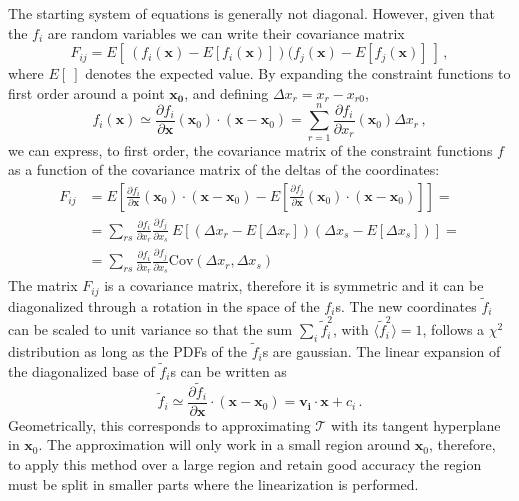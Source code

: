 \documentclass[10pt,a4paper]{article}
\newcommand{\bfx}{\mathbf{x}}
\begin{document}
The starting system of equations is generally not diagonal. However, given that the ${f_i}$ are random variables we can write their covariance matrix
\begin{equation}
F_{ij} = E[\ (f_i(\bfx) - E[f_i(\bfx)])(f_j(\bfx) - E[f_j(\bfx)]\ ]\, ,
\end{equation}
where $E[\ ]$ denotes the expected value. By expanding the constraint functions to first order around a point $\mathbf{x_0}$, and defining $\Delta x_r = x_r - x_{r0}$,
\begin{equation}
f_i(\bfx) \simeq \frac{\partial f_i}{\partial \bfx}(\bfx_0)\cdot (\bfx - \bfx_0) = \sum\limits_{r=1}^n \frac{\partial f_i}{\partial x_r}(\bfx_0)\Delta x_r\, ,
\end{equation}
we can express, to first order, the covariance matrix of the constraint functions {$f$} as a function of the covariance matrix of the deltas of the coordinates:
\begin{equation}
\begin{aligned}
F_{ij} &= E\left[\frac{\partial f_i}{\partial \bfx}(\bfx_0)\cdot (\bfx - \bfx_0) - E\left[\frac{\partial f_j}{\partial \bfx}(\bfx_0)\cdot (\bfx - \bfx_0) \right] \right] = \\
       &= \sum\limits_{rs}\frac{\partial f_i}{\partial x_r}\frac{\partial f_j}{\partial x_s} \ E\left[(\Delta x_r - E[\Delta x_r])(\Delta x_s - E[\Delta x_s])\right] = \\
       &= \sum\limits_{rs}\frac{\partial f_i}{\partial x_r}\frac{\partial f_j}{\partial x_s} \mbox{Cov}(\Delta x_r, \Delta x_s)
\end{aligned}
\end{equation}
The matrix $F_{ij}$ is a covariance matrix, therefore it is symmetric and it can be diagonalized through a rotation in the space of the $f_i$s. The new coordinates $\tilde{f}_i$ can be scaled to unit variance so that the sum $\sum_i \tilde{f}^2_i$, with $\langle\tilde{f}^2_i\rangle = 1$, follows a $\chi^2$ distribution as long as the PDFs of the $\tilde{f}_i$s are gaussian. The linear expansion of the diagonalized base of $\tilde{f}_i$s can be written as
\begin{equation}
\tilde{f}_i \simeq \frac{\partial \tilde{f}_i}{\partial \bfx}\cdot(\bfx - \bfx_0) = \mathbf{v_i} \cdot \bfx + c_i \, .
\label{eq:vis}
\end{equation}
Geometrically, this corresponds to approximating $\mathcal{T}$ with its tangent hyperplane in $\bfx_0$. The approximation will only work in a small region around $\bfx_0$, therefore, to apply this method over a large region and retain good accuracy the region must be split in smaller parts where the linearization is performed.
\end{document}
